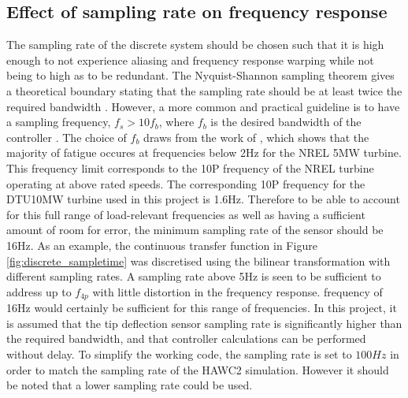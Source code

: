 

\subsection{Effect of sampling rate on frequency response}
The sampling rate of the discrete system should be chosen such that it is high enough to not experience aliasing and frequency response warping while not being to high as to be redundant. The Nyquist-Shannon sampling theorem gives a theoretical boundary stating that the sampling rate should be at least twice the required bandwidth \cite{smith1997scientist}. However, a more common and practical guideline is to have a sampling frequency, $f_s>10f_b$, where $f_b$ is the desired bandwidth of the controller \cite{hendricks2008linear}. The choice of $f_b$ draws from the work of \citet{bergami2014analysis}, which shows that the majority of fatigue occures at frequencies below 2Hz for the NREL 5MW turbine. This frequency limit corresponds to the 10P frequency of the NREL turbine operating at above rated speeds. The corresponding 10P frequency for the DTU10MW turbine used in this project is 1.6Hz. Therefore to be able to account for this full range of load-relevant frequencies as well as having a sufficient amount of room for error, the minimum sampling rate of the sensor should be 16Hz.
As an example, the continuous transfer function in Figure \ref{fig:discrete_sampletime} was discretised using the bilinear transformation with different sampling rates. A sampling rate above 5Hz is seen to be sufficient to address up to $f_{4p}$ with little distortion in the frequency response.  frequency of 16Hz would certainly be sufficient for this range of frequencies. In this project, it is assumed that the tip deflection sensor sampling rate is significantly higher than the required bandwidth, and that controller calculations can be performed without delay. To simplify the working code, the sampling rate is set to $100Hz$ in order to match the sampling rate of the HAWC2 simulation. However it should be noted that a lower sampling rate could be used. 


